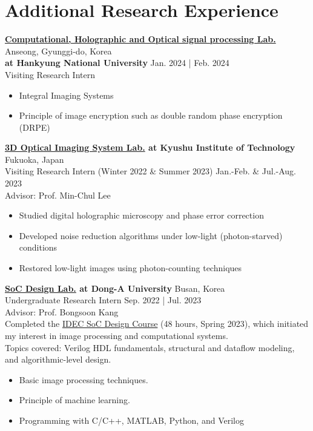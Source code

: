 \documentclass[a4paper,9pt]{extarticle}
\begin{document}
\section*{Additional Research Experience}

\noindent
\textbf{\href{https://3cholab.wordpress.com/정보/}{Computational, Holographic and Optical signal processing Lab.}} \hfill Anseong, Gyunggi-do, Korea\\ %
\textbf{at Hankyung National University} \hfill Jan. 2024 | Feb. 2024 \\
Visiting Research Intern %
\begin{itemize}
    \item Integral Imaging Systems
    \item Principle of image encryption such as double random phase encryption (DRPE) \\
\end{itemize}

\noindent
\textbf{\href{https://leelab.csn.kyutech.ac.jp}{3D Optical Imaging System Lab.} at Kyushu Institute of Technology} \hfill Fukuoka, Japan\\ %
Visiting Research Intern (Winter 2022 \& Summer 2023) \hfill Jan.-Feb. \& Jul.-Aug. 2023\\%
Advisor: Prof. Min-Chul Lee 
\begin{itemize}
    \item Studied digital holographic microscopy and phase error correction  
    \item Developed noise reduction algorithms under low-light (photon-starved) conditions  
    \item Restored low-light images using photon-counting techniques \\
\end{itemize}

\noindent
\textbf{\href{https://soc.donga.ac.kr/soc/Main.do}{SoC Design Lab.} at Dong-A University} \hfill Busan, Korea\\ %
Undergraduate Research Intern \hfill Sep. 2022 | Jul. 2023 \\
Advisor: Prof. Bongsoon Kang \\
Completed the \href{https://github.com/user-attachments/assets/583762df-f208-4216-b836-a6a1921ec34b}{IDEC SoC Design Course} (48 hours, Spring 2023), which initiated my interest in image processing and computational systems. \\
Topics covered: Verilog HDL fundamentals, structural and dataflow modeling, and algorithmic-level design.
\begin{itemize}
    \item Basic image processing techniques.
    \item Principle of machine learning.
    \item Programming with C/C++, MATLAB, Python, and Verilog \\
\end{itemize}
\end{document}
